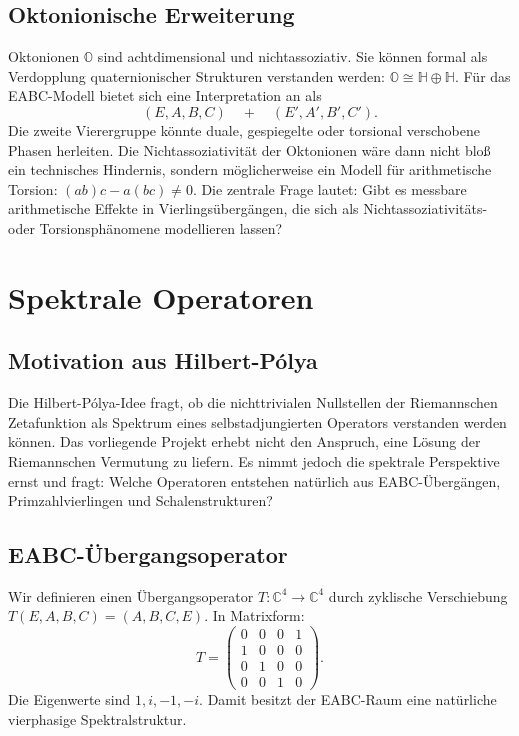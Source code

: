 \documentclass[11pt,a4paper,bibliography=totoc]{scrartcl}
\begin{document}
\subsection{Oktonionische Erweiterung}
Oktonionen $\mathbb{O}$ sind achtdimensional und nichtassoziativ. Sie können formal als Verdopplung quaternionischer Strukturen verstanden werden: $\mathbb{O} \cong \mathbb{H} \oplus \mathbb{H}$. Für das EABC-Modell bietet sich eine Interpretation an als
\[
(E, A, B, C) \quad + \quad (E', A', B', C').
\]
Die zweite Vierergruppe könnte duale, gespiegelte oder torsional verschobene Phasen herleiten. Die Nichtassoziativität der Oktonionen wäre dann nicht bloß ein technisches Hindernis, sondern möglicherweise ein Modell für arithmetische Torsion: $(ab)c - a(bc) \neq 0$. Die zentrale Frage lautet: Gibt es messbare arithmetische Effekte in Vierlingsübergängen, die sich als Nichtassoziativitäts- oder Torsionsphänomene modellieren lassen?

\section{Spektrale Operatoren}

\subsection{Motivation aus Hilbert-Pólya}
Die Hilbert-Pólya-Idee fragt, ob die nichttrivialen Nullstellen der Riemannschen Zetafunktion als Spektrum eines selbstadjungierten Operators verstanden werden können. Das vorliegende Projekt erhebt nicht den Anspruch, eine Lösung der Riemannschen Vermutung zu liefern. Es nimmt jedoch die spektrale Perspektive ernst und fragt: Welche Operatoren entstehen natürlich aus EABC-Übergängen, Primzahlvierlingen und Schalenstrukturen?

\subsection{EABC-Übergangsoperator}
Wir definieren einen Übergangsoperator $T : \mathbb{C}^4 \to \mathbb{C}^4$ durch zyklische Verschiebung $T(E,A,B,C) = (A,B,C,E)$. In Matrixform:
\[
T = \begin{pmatrix}
0 & 0 & 0 & 1 \\
1 & 0 & 0 & 0 \\
0 & 1 & 0 & 0 \\
0 & 0 & 1 & 0
\end{pmatrix}.
\]
Die Eigenwerte sind $1, i, -1, -i$. Damit besitzt der EABC-Raum eine natürliche vierphasige Spektralstruktur.
\end{document}
